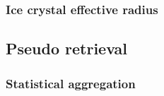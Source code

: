\subsubsection{Ice crystal effective radius}


\subsection{Pseudo retrieval}
\subsubsection{Statistical aggregation}

%
%
%
%
